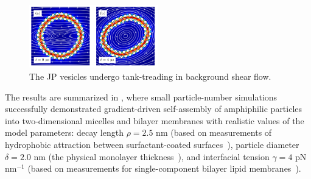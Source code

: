 \begin{figure}
\includegraphics[width=0.5\textwidth]{figures/PreliminaryWork/TankTreading.pdf}
\caption{The JP vesicles undergo tank-treading in background shear flow.}
\end{figure}
The results are summarized in \cite{Fu2018_SIAM}, where
small particle-number simulations successfully demonstrated gradient-driven self-assembly of
amphiphilic particles into two-dimensional micelles and bilayer membranes with realistic values of
the model parameters: decay length $\rho=2.5$ nm (based on measurements of
hydrophobic attraction between surfactant-coated
surfaces~\cite{Eriksson1989, Lin2005, Parsegian, Israelachvili80}),
particle diameter $\delta = 2.0$ nm (the physical monolayer thickness~\cite{Boal}),
and interfacial tension $\gamma = 4$ pN nm$^{-1}$ (based on
measurements for single-component bilayer lipid
membranes~\cite{GarciaSaez, KUZMIN2005, Petelska2012, Jackson2016}).


